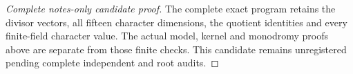 \begin{proof}[Complete notes-only candidate proof]
The complete exact program 
retains the divisor vectors, all fifteen character dimensions,
the quotient identities and every finite-field character value.
The actual model, kernel and monodromy proofs above are separate
from those finite checks. This candidate remains unregistered
pending complete independent and root audits.
\end{proof}
